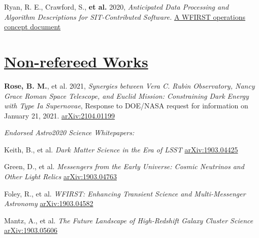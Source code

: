 \documentclass[margin]{res}
\begin{document}
\begin{resume}
\hangindent=15pt 
Ryan, R. E., Crawford, S., \textbf{et al.} 2020, {\sl Anticipated Data Processing and Algorithm Descriptions for SIT-Contributed Software.} \href{https://outerspace.stsci.edu/display/FWG/Anticipated+Data+Processing+and+Algorithm+Descriptions+for+SIT-Contributed+Software}{A WFIRST operations concept document}

\section{\href{https://ui.adsabs.harvard.edu/\#search/q=orcid\%3A\%220000-0002-1873-8973\%22&sort=date\%20desc\%2C\%20bibcode\%20desc}{Non-refereed Works}}

\hangindent=15pt 
\textbf{Rose, B. M.}, et al. 2021, {\sl Synergies between Vera C. Rubin Observatory, Nancy Grace Roman Space Telescope, and Euclid Mission: Constraining Dark Energy with Type Ia Supernovae}, Response to DOE/NASA request for information on January 21, 2021. \href{https://arxiv.org/abs/2104.01199}{arXiv:2104.01199}
\vspace{-12pt}


\textit{Endorsed Astro2020 Science Whitepapers:}

\vspace{-12pt}\hspace{15pt}\hangindent=30pt 
Keith, B., et al. \textit{Dark Matter Science in the Era of LSST}
\href{https://ui.adsabs.harvard.edu/abs/2019arXiv190304425B/abstract}{arXiv:1903.04425}

\vspace{-12pt}\hspace{15pt}\hangindent=30pt 
Green, D., et al. \textit{Messengers from the Early Universe: Cosmic Neutrinos and Other Light Relics}
\href{https://ui.adsabs.harvard.edu/abs/2019arXiv190304763G/abstract}{arXiv:1903.04763}

\vspace{-12pt}\hspace{15pt}\hangindent=30pt 
Foley, R., et al. \textit{WFIRST: Enhancing Transient Science and Multi-Messenger Astronomy}
\href{https://ui.adsabs.harvard.edu/abs/2019arXiv190304582F/abstract}{arXiv:1903.04582}

\vspace{-12pt}\hspace{15pt}\hangindent=30pt
Mantz, A., et al. \textit{The Future Landscape of High-Redshift Galaxy Cluster Science}\\
\href{https://ui.adsabs.harvard.edu/abs/2019BAAS...51c.279M/abstract}{arXiv:1903.05606}


\end{resume}
\end{document}
